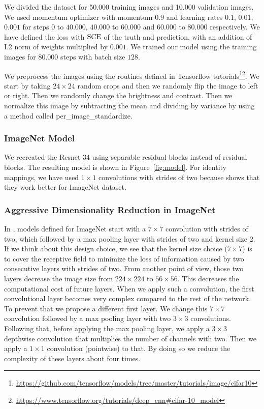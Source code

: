 We divided the dataset for 50.000 training images and 10.000 validation images. We used momentum optimizer with momentum $0.9$ and learning rates $0.1$, $0.01$, $0.001$ for steps $0$ to $40.000$, $40.000$ to $60.000$ and $60.000$ to $80.000$ respectively. We have defined the loss with $\textrm{SCE}$ of the truth and prediction, with an addition of L2 norm of weights multiplied by $0.001$. We trained our model using the training images for $80.000$ steps with batch size $128$. 

We preprocess the images using the routines defined in Tensorflow tutorials\footnote{\url{https://github.com/tensorflow/models/tree/master/tutorials/image/cifar10}}\footnote{\url{https://www.tensorflow.org/tutorials/deep\_cnn\#cifar-10\_model}}. We start by taking $24 \times 24$ random crops and then we randomly flip the image to left or right. Then we randomly change the brightness and contrast. Then we normalize this image by subtracting the mean and dividing by variance by using a method called per\_image\_standardize.


\subsubsection{ImageNet Model}
We recreated the Resnet-34 using separable residual blocks instead of residual blocks. The resulting model is shown in Figure~\ref{fig:model}. For identity mappings, we have used $1 \times 1$ convolutions with strides of two because \cite{He:2015aa} shows that they work better for ImageNet dataset.

\subsubsection{Aggressive Dimensionality Reduction in ImageNet}
In \cite{He:2015aa}, models defined for ImageNet start with a $7 \times 7$ convolution with strides of two, which followed by a max pooling layer with strides of two and kernel size 2. If we think about this design choice, we see that the kernel size choice ($7 \times 7$) is to cover the receptive field to minimize the loss of information caused by two consecutive layers with strides of two. From another point of view, those two layers decrease the image size from $224 \times 224$ to $56 \times 56$. This decreases the computational cost of future layers. When we apply such a convolution, the first convolutional layer becomes very complex compared to the rest of the network. To prevent that we propose a different first layer. We change this $7 \times 7$ convolution followed by a max pooling layer with two $3 \times 3$ convolutions. 
Following that, before applying the max pooling layer, we apply a $3 \times 3$ depthwise convolution that multiplies the number of channels with two. Then we apply a $1 \times 1$ convolution (pointwise) to that.  By doing so we reduce the complexity of these layers about four times. 

